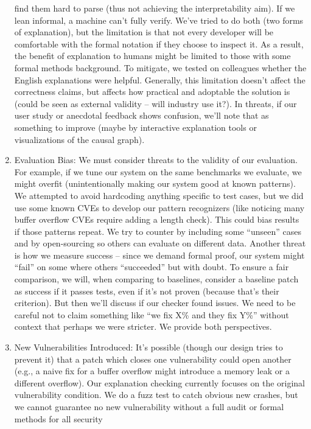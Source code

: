 \documentclass[conference,compsoc]{IEEEtran}
\begin{document}
\begin{enumerate}
  find them hard to parse (thus not achieving the interpretability aim).
  If we lean informal, a machine can't fully verify. We've tried to do
  both (two forms of explanation), but the limitation is that not every
  developer will be comfortable with the formal notation if they choose
  to inspect it. As a result, the benefit of explanation to humans might
  be limited to those with some formal methods background. To mitigate,
  we tested on colleagues whether the English explanations were helpful.
  Generally, this limitation doesn't affect the correctness claims, but
  affects how practical and adoptable the solution is (could be seen as
  external validity -- will industry use it?). In threats, if our user
  study or anecdotal feedback shows confusion, we'll note that as
  something to improve (maybe by interactive explanation tools or
  visualizations of the causal graph).
\item
  Evaluation Bias: We must consider threats to the validity of our
  evaluation. For example, if we tune our system on the same benchmarks
  we evaluate, we might overfit (unintentionally making our system good
  at known patterns). We attempted to avoid hardcoding anything specific
  to test cases, but we did use some known CVEs to develop our pattern
  recognizers (like noticing many buffer overflow CVEs require adding a
  length check). This could bias results if those patterns repeat. We
  try to counter by including some ``unseen'' cases and by open-sourcing
  so others can evaluate on different data. Another threat is how we
  measure success -- since we demand formal proof, our system might
  ``fail'' on some where others ``succeeded'' but with doubt. To ensure
  a fair comparison, we will, when comparing to baselines, consider a
  baseline patch as success if it passes tests, even if it's not proven
  (because that's their criterion). But then we'll discuss if our
  checker found issues. We need to be careful not to claim something
  like ``we fix X\% and they fix Y\%'' without context that perhaps we
  were stricter. We provide both perspectives.
\item
  New Vulnerabilities Introduced: It's possible (though our design tries
  to prevent it) that a patch which closes one vulnerability could open
  another (e.g., a naive fix for a buffer overflow might introduce a
  memory leak or a different overflow). Our explanation checking
  currently focuses on the original vulnerability condition. We do a
  fuzz test to catch obvious new crashes, but we cannot guarantee no new
  vulnerability without a full audit or formal methods for all security

\end{enumerate}
\end{document}
